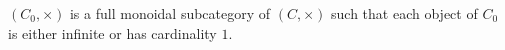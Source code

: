 $(C_0, \times)$ is a full monoidal subcategory of $(C, \times)$ such that each object of $C_0$ is either infinite or has cardinality $1$.

